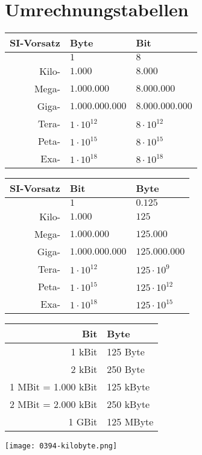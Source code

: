 \documentclass[10pt,a4paper,notitlepage]{scrartcl}
\begin{document}
\newpage
\section{Umrechnungstabellen}
\begin{center}
\begin{tabularx}{8cm}{r|l|l}
\textbf{SI-Vorsatz}&\textbf{Byte}&\textbf{Bit}\\
\hline
&$1$&$8$\\
Kilo-&$1.000$&$8.000$\\
Mega-&$1.000.000$&$8.000.000$\\
Giga-&$1.000.000.000$&$8.000.000.000$\\
Tera-&$1\cdot 10^{12}$&$8\cdot 10^{12}$\\
Peta-&$1\cdot 10^{15}$&$8\cdot 10^{15}$\\
Exa-&$1\cdot 10^{18}$&$8\cdot 10^{18}$
\end{tabularx}
\hspace{5mm}
\begin{tabularx}{8cm}{r|l|l}
\textbf{SI-Vorsatz}&\textbf{Bit}&\textbf{Byte}\\
\hline
&$1$&$0.125$\\
Kilo-&$1.000$&$125$\\
Mega-&$1.000.000$&$125.000$\\
Giga-&$1.000.000.000$&$125.000.000$\\
Tera-&$1\cdot 10^{12}$&$125\cdot 10^{9}$\\
Peta-&$1\cdot 10^{15}$&$125\cdot 10^{12}$\\
Exa-&$1\cdot 10^{18}$&$125\cdot 10^{15}$
\end{tabularx}
\end{center}
\begin{center}
\begin{tabularx}{8cm}{r|l}
\textbf{Bit}&\textbf{Byte}\\
\hline
1 kBit&125 Byte\\
2 kBit&250 Byte\\
1 MBit = 1.000 kBit&125 kByte\\
2 MBit = 2.000 kBit&250 kByte\\
1 GBit&125 MByte\\
\end{tabularx}
\hspace{5mm}
\begin{minipage}{8cm}
\texttt{[image: 0394-kilobyte.png]}
\end{minipage}
\end{center}
\vspace{2mm}
\end{document}
